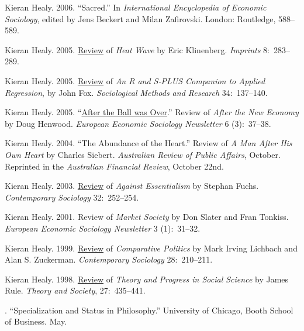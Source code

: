 \documentclass[11pt]{article}
\begin{document}
\ind  Kieran Healy. 2006. ``Sacred.'' In \emph{International Encyclopedia of Economic Sociology}, edited by Jens Beckert and Milan Zafirovski. London: Routledge, 588--589. 

\ind  Kieran Healy. 2005. \href{http://www.kieranhealy.org/files/reviews/klinenberg.pdf}{Review} of \emph{Heat Wave} by Eric Klinenberg. \emph{Imprints} 8:~283--289.

\ind  Kieran Healy. 2005. \href{http://www.kieranhealy.org/files/reviews/fox.pdf}{Review} of \emph{An R and S-PLUS Companion to Applied Regression}, by John Fox. \emph{Sociological Methods and Research} 34:~137--140.

\ind  Kieran Healy. 2005. ``\href{http://www.kieranhealy.org/files/reviews/henwood.pdf}{After the Ball was Over}.'' Review of \emph{After the New
  Economy} by Doug Henwood. \emph{European Economic Sociology Newsletter} 6 (3):~37--38.

\ind  Kieran Healy. 2004. ``The Abundance of the Heart.'' Review of \emph{A Man After His Own Heart} by Charles
Siebert. \emph{Australian Review of Public Affairs}, October. Reprinted in the
\emph{Australian Financial Review}, October 22nd.

\ind  Kieran Healy. 2003. \href{http://links.jstor.org/sici?sici=0094-3061%28200303%2932%3A2%3C252%3AAEATOC%3E2.0.CO%3B2-F}{Review} of \emph{Against Essentialism} by Stephan Fuchs.
\emph{Contemporary Sociology} 32:~252--254.

\ind  Kieran Healy. 2001. Review of \emph{Market Society} by Don Slater and Fran Tonkiss. \emph{European
      Economic Sociology Newsletter} 3 (1):~31--32.


\ind  Kieran Healy. 1999. \href{http://links.jstor.org/sici?sici=0094-3061%28199903%2928%3A2%3C210%3ACPRCAS%3E2.0.CO%3B2-C}{Review} of \emph{Comparative Politics} by Mark Irving Lichbach and Alan S.
Zuckerman. \emph{Contemporary Sociology} 28:~210--211.


\ind  Kieran Healy. 1998. \href{http://www.kieranhealy.org/files/reviews/rule.pdf}{Review} of \emph{Theory and Progress in Social Science} by James Rule.  \emph{Theory
  and Society}, 27:~435--441.

 \bigskip

\medskip

. ``Specialization and Status in Philosophy.'' University of Chicago, Booth School of Business. May.
\end{document}
